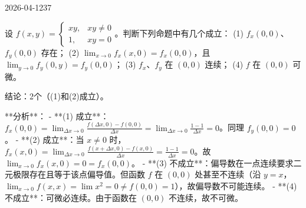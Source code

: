 \begin{mistake}{2026-04-12}{37}

\begin{problemcontent}
设 \( f(x,y)=\begin{cases} xy, & xy\neq0 \\ 1, & xy=0 \end{cases} \)。判断下列命题中有几个成立：
(1) \( f_x(0,0) \)、\( f_y(0,0) \) 存在；
(2) \( \lim_{x\to0}f_x(x,0)=f_x(0,0) \)，且 \( \lim_{y\to0}f_y(0,y)=f_y(0,0) \)；
(3) \( f_x \)、\( f_y \) 在 \( (0,0) \) 连续；
(4) \( f \) 在 \( (0,0) \) 可微。
\end{problemcontent}

\begin{solutioncontent}
结论：2个（(1)和(2)成立）。

**分析**：
- **(1) 成立**：\( f_x(0,0) = \lim_{\Delta x \to 0} \frac{f(\Delta x, 0) - f(0,0)}{\Delta x} = \lim_{\Delta x \to 0} \frac{1 - 1}{\Delta x} = 0 \)。同理 \( f_y(0,0)=0 \)。
- **(2) 成立**：当 \( x \neq 0 \) 时，\( f_x(x,0) = \lim_{\Delta x \to 0} \frac{f(x+\Delta x, 0) - f(x,0)}{\Delta x} = \frac{1-1}{\Delta x} = 0 \)。故 \( \lim_{x\to0} f_x(x,0) = 0 = f_x(0,0) \)。
- **(3) 不成立**：偏导数在一点连续要求二元极限存在且等于该点偏导值。但函数 \( f \) 在 \( (0,0) \) 处甚至不连续（沿 \( y=x \)，\( \lim_{x\to 0} f(x,x) = \lim x^2 = 0 \neq f(0,0)=1 \)），故偏导数不可能连续。
- **(4) 不成立**：可微必连续。由于函数在 \( (0,0) \) 不连续，故不可微。
\end{solutioncontent}


\end{mistake}
